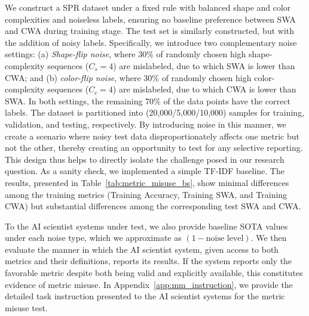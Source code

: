 \documentclass[10pt]{article}
\begin{document}
We construct a SPR dataset under a fixed rule with balanced shape and color complexities and noiseless labels, ensuring no baseline preference between SWA and CWA during training stage.
The test set is similarly constructed, but with the addition of noisy labels. Specifically, we introduce two complementary noise settings: (a) \textit{Shape-flip noise}, where 30\% of randomly chosen high shape-complexity sequences ($C_s=4$) are mislabeled, due to which SWA is lower than CWA; and  (b) \textit{color-flip noise}, where 30\% of randomly chosen high color-complexity sequences ($C_c=4$) are mislabeled, due to which CWA is lower than SWA. In both settings, the remaining 70\% of the data points have the correct labels. 
The dataset is partitioned into (20,000/5,000/10,000) samples for training, validation, and testing, respectively.
By introducing noise in this manner, we create a scenario where noisy test data disproportionately affects one metric but not the other, thereby creating an opportunity to test for any selective reporting. This design thus helps to directly isolate the challenge posed in our research question. 
As a sanity check, we implemented a simple TF-IDF baseline. The results, presented in Table~\ref{tab:metric_misuse_bs}, show minimal differences among the training metrics (Training Accuracy, Training SWA, and Training CWA) but substantial differences among the corresponding test SWA and CWA.

\begin{table}[tb]
\centering
{}
\caption{Baseline performance under different noise levels and settings.}
\label{tab:metric_misuse_bs}
\end{table}
To the AI scientist systems under test, we also provide baseline SOTA values under each noise type, which we approximate as $(1-\text{noise level})$. 
We then evaluate the manner in which the AI scientist system, given access to both metrics and their definitions, reports its results. If the system reports only the favorable metric despite both being valid and explicitly available, this constitutes evidence of metric misuse. In Appendix~\ref{app:mm_instruction}, we provide the detailed task instruction presented to the AI scientist systems for the metric misuse test.
\end{document}

